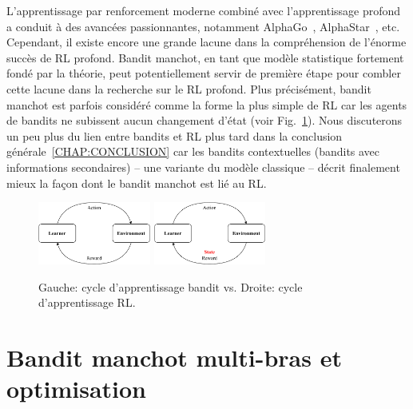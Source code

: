 L'apprentissage par renforcement moderne combiné avec l'apprentissage profond a conduit à des avancées passionnantes, notamment AlphaGo~\citep{silver2016alphago}, AlphaStar~\citep{vinyals2019alphastar}, etc. Cependant, il existe encore une grande lacune dans la compréhension de l'énorme succès de RL profond. Bandit manchot, en tant que modèle statistique fortement fondé par la théorie, peut potentiellement servir de première étape pour combler cette lacune dans la recherche sur le RL profond. Plus précisément, bandit manchot est parfois considéré comme la forme la plus simple de RL car les agents de bandits ne subissent aucun changement d'état (voir Fig.~\ref{fig:abs.comparison}). Nous discuterons un peu plus du lien entre bandits et RL plus tard dans la conclusion générale~\ref{CHAP:CONCLUSION} car les bandits contextuelles (bandits avec informations secondaires) -- une variante du modèle classique -- décrit finalement mieux la façon dont le bandit manchot est lié au RL.

\begin{figure}[ht]
    \centering
    \includegraphics[width=0.33\textwidth]{Chapter0/img/mab.pdf}
    \includegraphics[width=0.33\textwidth]{Chapter0/img/rl.pdf}
    \caption{Gauche: cycle d'apprentissage bandit vs. Droite: cycle d'apprentissage RL.}
    \label{fig:abs.comparison}
\end{figure}

\section{Bandit manchot multi-bras et optimisation}\label{sec:abs.mab}
    
